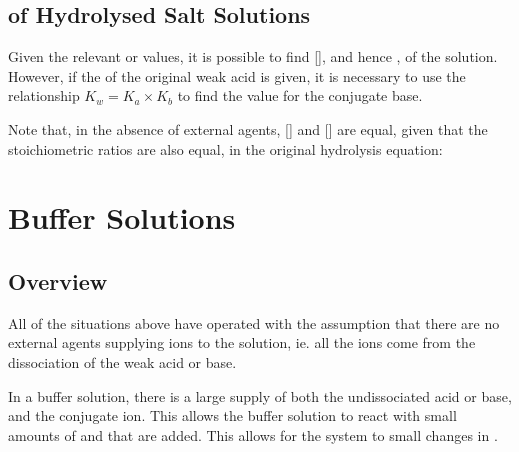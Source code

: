 

		\subsection{\MpH{} of Hydrolysed Salt Solutions}

			Given the relevant \Ka{} or \Kb{} values, it is possible to find [], and hence \pH{}, of the solution. However,
			if the \Ka{} of the original weak acid is given, it is necessary to use the relationship $K_{w} = K_{a} \times K_{b}$ to find
			the \Kb{} value for the conjugate base.


			Note that, in the absence of external agents, [] and [] are equal, given that the stoichiometric ratios
			are also equal, in the original hydrolysis equation:








	\pagebreak
	\section{Buffer Solutions}

		\subsection{Overview}

			All of the situations above have operated with the assumption that there are no external agents supplying ions to the solution,
			ie. all the ions come from the dissociation of the weak acid or base.

			In a buffer solution, there is a large supply of both the undissociated acid or base, and the conjugate ion. This allows the
			buffer solution to react with small amounts of   and  that are added. This allows for the system
			to  small changes in \pH{}.

